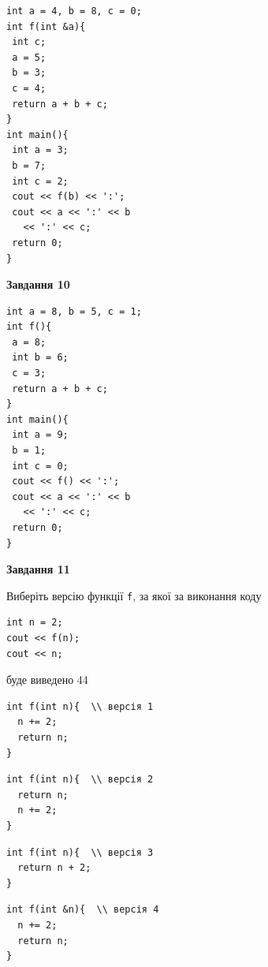 \documentclass[12pt, ukrainian]{article}
\def\code#1{\Verb!#1!}
\begin{document}
{\begin {large}
\begin{minipage}[t]{7.0cm}
\begin{verbatim}
int a = 4, b = 8, c = 0;
int f(int &a){
 int c;
 a = 5;
 b = 3;
 c = 4;
 return a + b + c;
}
int main(){
 int a = 3;
 b = 7;
 int c = 2;
 cout << f(b) << ':';
 cout << a << ':' << b 
   << ':' << c;
 return 0;
}
\end{verbatim}



\begin{center}
\textbf{Завдання 10}
\end{center}
\vspace{-8mm}

\begin{verbatim}
int a = 8, b = 5, c = 1;
int f(){
 a = 8;
 int b = 6;
 c = 3;
 return a + b + c;
}
int main(){
 int a = 9;
 b = 1;
 int c = 0;
 cout << f() << ':';
 cout << a << ':' << b 
   << ':' << c;
 return 0;
}
\end{verbatim}

\end{minipage}
\vline \hspace{1mm}
\begin{minipage}[t]{11.0cm}

\begin{center}
\textbf{Завдання 11}
\end{center}
Виберіть версію функції \code{f}, за якої за виконання коду
\begin{verbatim}
int n = 2;
cout << f(n);
cout << n;
\end{verbatim}

буде виведено 44

\begin{verbatim}
int f(int n){  \\ версія 1
  n += 2;
  return n;
}
\end{verbatim}

\vspace{-8mm}\begin{verbatim}
int f(int n){  \\ версія 2
  return n;
  n += 2;
}
\end{verbatim}

\vspace{-8mm}\begin{verbatim}
int f(int n){  \\ версія 3
  return n + 2;
}
\end{verbatim}

\vspace{-8mm}\begin{verbatim}
int f(int &n){  \\ версія 4
  n += 2;
  return n;
}
\end{verbatim}




\end{minipage}
\end{large}}
\end{document}
